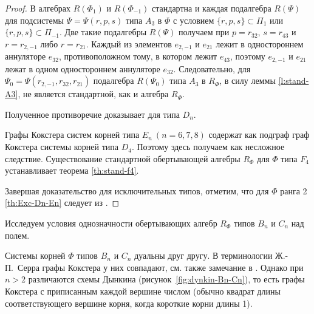 \documentclass[a4paper,14pt,oneside,openany]{memoir}
\begin{document}
\begin{proof}
    В алгебрах $R(\Phi_1)$ и $R(\Phi_{-1})$ стандартна и каждая подалгебра
    $R({\Psi})$ для подсистемы $\Psi=\Psi(r,p,s)$ типа $A_{3}$ в $\Phi$ с условием
    $\{r ,p,s\}\subset \Pi_{1}$ или $\{r ,p,s\}\subset \Pi_{-1}$. Две такие
    подалгебры $R({\Psi})$ получаем при $p=r_{32}$, $s=r_{43}$ и $r=r_{2,-1}$ либо
    $r=r_{21}$. Каждый из элементов $e_{2,-1}$ и $e_{21}$ лежит в одностороннем
    аннуляторе $e_{32}$, противоположном тому, в котором лежит $e_{43}$, поэтому
    $e_{2,-1}$ и $e_{21}$ лежат в одном одностороннем аннуляторе $e_{32}$.
    Следовательно, для $\Psi_0 =\Psi (r_{2, -1}, r_{32}, r_{2 1})$ подалгебра
    $R({\Psi_0})$ типа $A_{3}$ в $R_{\Phi}$, в силу леммы \ref{l:stand-A3}, не
    является стандартной, как и алгебра $R_{\Phi}$.

    Полученное противоречие доказывает  для типа $D_n$.

    \medskip

    Графы Кокстера систем корней типа $E_n \ (n=6,7,8)$ содержат как подграф граф
    Кокстера системы корней типа $D_4$. Поэтому здесь 
    получаем как несложное следствие. Существование стандартной обертывающей
    алгебры $R_{\Phi}$ для $\Phi$ типа $F_4$ устанавливает теорема
    \ref{th:stand-f4}.

    Завершая доказательство для исключительных типов, отметим, что для $\Phi$ ранга
    2 \cref{th:Exc-Dn-En} следует из .
\end{proof}

Исследуем условия однозначности обертывающих алгебр $R_{\Phi}$ типов $B_n$ и
$C_n$ над полем.

Системы корней $\Phi$ типов $B_n$ и $C_n$ дуальны друг другу. В терминологии
Ж.\nobreakdash-П.~Серра \cite{Serre} графы Кокстера у них совпадают, см. также
замечание в \cite[\S~1]{JA-12}. Однако при $n>2$ различаются схемы Дынкина
(рисунок~\ref{fig:dynkin-Bn-Cn}), то есть графы Кокстера с приписанным каждой
вершине числом (обычно квадрат длины соответствующего вершине корня, когда
короткие корни длины 1).

\medskip
\end{document}
